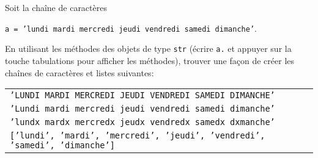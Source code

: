 \begin{exercice}
Soit la chaîne de caractères
\begin{center}
\texttt{a = 'lundi mardi mercredi jeudi vendredi samedi dimanche'}.
\end{center}
En utilisant les méthodes des objets de type \texttt{str} (écrire \texttt{a.} et
appuyer sur la touche tabulations pour afficher les méthodes), trouver une
façon de créer les chaînes de caractères et listes suivantes:
\begin{center}
\begin{tabular}{l}
\texttt{'LUNDI MARDI MERCREDI JEUDI VENDREDI SAMEDI DIMANCHE'}\\
\texttt{'Lundi mardi mercredi jeudi vendredi samedi dimanche'}\\
\texttt{'lundx mardx mercredx jeudx vendredx samedx dxmanche'}\\
\texttt{['lundi', 'mardi', 'mercredi', 'jeudi', 'vendredi', 'samedi', 'dimanche']}
\end{tabular}
\end{center}
\end{exercice}



